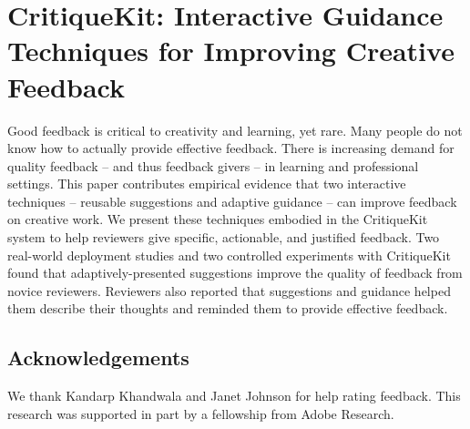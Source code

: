 \chapter{CritiqueKit: Interactive Guidance Techniques for Improving Creative Feedback}
Good feedback is critical to creativity and learning, yet rare. Many people do not know how to actually provide effective feedback. There is increasing demand for quality feedback – and thus feedback givers – in learning and professional settings. This paper contributes empirical evidence that two interactive techniques – reusable suggestions and adaptive guidance – can improve feedback on creative work. We present these techniques embodied in the CritiqueKit system to help reviewers give specific, actionable, and justified feedback. Two real-world deployment studies and two controlled experiments with CritiqueKit found that adaptively-presented suggestions improve the quality of feedback from novice reviewers. Reviewers also reported that suggestions and guidance helped them describe their thoughts and reminded them to provide effective feedback.









\section{Acknowledgements}
We thank Kandarp Khandwala and Janet Johnson for help rating feedback. This research was supported in part by a fellowship from Adobe Research.